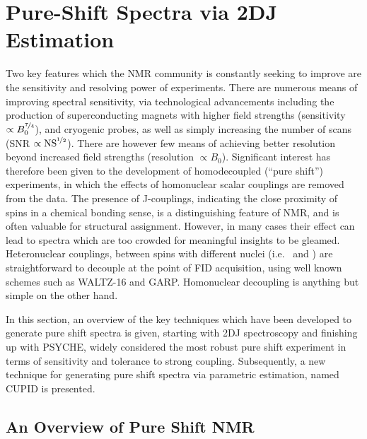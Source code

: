 \section{Pure-Shift Spectra via \acl{2DJ} Estimation}
\label{sec:pure-shift}

Two key features which the \ac{NMR} community is constantly seeking to improve
are the sensitivity and resolving power of experiments. There are
numerous means of improving spectral sensitivity, via technological
advancements including the production of superconducting magnets with higher
field strengths (sensitivity $\propto B_0^{\nicefrac{7}{4}}$),
and cryogenic probes\cite{Kovacs2005}, as well as simply increasing the number
of scans (\ac{SNR} $\propto \text{NS}^{\nicefrac{1}{2}}$).  There are however
few means of achieving better resolution beyond increased field strengths
(resolution $\propto B_0$). Significant interest has therefore been
given to the development of homodecoupled (``pure shift'')
experiments\cite{Meyer2013,Adams2014,Zangger2015}, in which the
effects of homonuclear scalar couplings are removed from the data. The presence
of J-couplings, indicating the close proximity of spins in a chemical
bonding sense, is a distinguishing feature of \ac{NMR}, and is often valuable for
structural assignment. However, in many cases their effect can lead to spectra
which are too crowded for meaningful insights to be gleamed.  Heteronuclear
couplings, between spins with different nuclei (i.e. \proton\ and \carbon) are
straightforward to decouple at the point of \ac{FID} acquisition, using well
known schemes such as WALTZ-16\cite{Shaka1983a, Shaka1983b} and
GARP\cite{Shaka1985}. Homonuclear decoupling is anything but simple on the
other hand.

In this section, an overview of the key techniques which have
been developed to generate pure shift spectra is given, starting with \ac{2DJ}
spectroscopy and finishing up with \ac{PSYCHE}, widely considered the most
robust pure shift experiment in terms of sensitivity and tolerance to strong
coupling. Subsequently, a new technique for generating pure shift spectra via
parametric estimation, named \acf{CUPID} is presented.

\subsection{An Overview of Pure Shift NMR}

